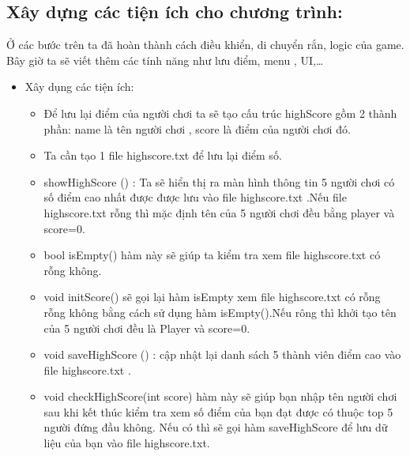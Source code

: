 \documentclass[13pt,a4paper]{article}
\begin{document}
\subsection{Xây dựng các tiện ích cho chương trình:}
\indent Ở các bước trên ta đã hoàn thành cách điều khiển, di chuyển rắn, logic của game. Bây giờ ta sẽ viết thêm các tính năng như lưu điểm, menu , UI,…
\begin{itemize}

    \item Xây dụng các tiện ích:
    \begin{itemize}
        \item Để lưu lại điểm của người chơi ta sẽ tạo cấu trúc highScore gồm 2 thành phần: name là tên người chơi , score là điểm của người chơi đó.
	    \item Ta cần tạo 1 file highscore.txt để lưu lại điểm số.
	    \item showHighScore () : Ta sẽ hiển thị ra màn hình thông tin 5 người chơi có số điểm cao nhất được  được lưu vào file highscore.txt .Nếu file highscore.txt rỗng thì mặc định tên của 5 người chơi đều bằng player và score=0.
	    \item bool isEmpty() hàm này sẽ giúp ta kiểm tra xem file highscore.txt có rỗng không.
	    \item void initScore() sẽ gọi lại hàm isEmpty xem file highscore.txt có rỗng rỗng không bằng cách sử dụng hàm isEmpty().Nếu rông thì khởi tạo tên của 5 người chơi đều là Player và score=0.
	    \item void saveHighScore () : cập nhật lại danh sách 5 thành viên điểm cao vào file highscore.txt .
	    \item void checkHighScore(int score) hàm này sẽ giúp bạn nhập tên người chơi sau khi kết thúc kiểm tra xem số điểm của bạn đạt được có thuộc top 5 người đứng đầu không. Nếu có thì sẽ gọi hàm saveHighScore để lưu dữ liệu của bạn vào file highscore.txt. 
    \end{itemize}
	

\end{itemize}
\end{document}
